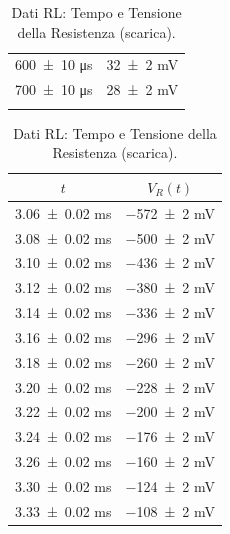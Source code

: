 \documentclass[a4paper]{article}
\begin{document}
\begin{appendices}
\begin{table}[htbp]
\begin{minipage}{0.48\textwidth}
\begin{tabular}{|c|c|}
        \num{600  \pm 10} \si{\micro\second} & \num{32   \pm 2} \si{\milli\volt} \\
        \num{700  \pm 10} \si{\micro\second} & \num{28   \pm 2} \si{\milli\volt} \\
        \hline
        \multicolumn{2}{c}{\rule{0pt}{10ex}} %
        \end{tabular}
        \caption{Dati RL: Tempo e Tensione della Resistenza (scarica).}
        \label{tab:rl_data_scarica_r}
    \end{minipage}\hfill
    \begin{minipage}{0.48\textwidth} %
        \centering\small
        \begin{tabular}{|c|c|}
        \hline
         \( t \) & \( V_R(t) \) \\ %
        \hline\hline
        \num{3.06  \pm 0.02} \si{\milli\second} & \num{-572 \pm 2} \si{\milli\volt} \\
        \num{3.08  \pm 0.02} \si{\milli\second} & \num{-500 \pm 2} \si{\milli\volt} \\
        \num{3.10  \pm 0.02} \si{\milli\second} & \num{-436 \pm 2} \si{\milli\volt} \\
        \num{3.12  \pm 0.02} \si{\milli\second} & \num{-380 \pm 2} \si{\milli\volt} \\
        \num{3.14  \pm 0.02} \si{\milli\second} & \num{-336 \pm 2} \si{\milli\volt} \\
        \num{3.16  \pm 0.02} \si{\milli\second} & \num{-296 \pm 2} \si{\milli\volt} \\
        \num{3.18  \pm 0.02} \si{\milli\second} & \num{-260 \pm 2} \si{\milli\volt} \\
        \num{3.20  \pm 0.02} \si{\milli\second} & \num{-228 \pm 2} \si{\milli\volt} \\
        \num{3.22  \pm 0.02} \si{\milli\second} & \num{-200 \pm 2} \si{\milli\volt} \\
        \num{3.24  \pm 0.02} \si{\milli\second} & \num{-176 \pm 2} \si{\milli\volt} \\
        \num{3.26  \pm 0.02} \si{\milli\second} & \num{-160 \pm 2} \si{\milli\volt} \\
        \num{3.30  \pm 0.02} \si{\milli\second} & \num{-124 \pm 2} \si{\milli\volt} \\
        \num{3.33  \pm 0.02} \si{\milli\second} & \num{-108 \pm 2} \si{\milli\volt} \\

\end{tabular}
\end{minipage}
\end{table}
\end{appendices}
\end{document}

